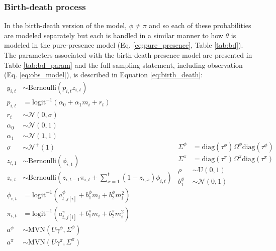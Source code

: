 \documentclass[12pt,letterpaper]{article}
\begin{document}
\subsubsection*{Birth-death process}
In the birth-death version of the model, \(\phi \neq \pi\) and so each of these probabilities are modeled separately but each is handled in a similar manner to how \(\theta\) is modeled in the pure-presence model (Eq. \ref{eq:pure_presence}, Table \ref{tab:bd}). The parameters associated with the birth-death presence model are presented in Table \ref{tab:bd_param} and the full sampling statement, including observation (Eq. \ref{eq:obs_model}), is described in Equation \ref{eq:birth_death}:
\begin{equation}
  \begin{split}
    y_{i, t} &\sim \text{Bernoulli}(p_{i, t} z_{i, t}) \\
    p_{i, t} &= \text{logit}^{-1}(\alpha_{0} + \alpha_{1} m_{i} + r_{t}) \\ 
    r_{t} &\sim \mathcal{N}(0, \sigma) \\
    \alpha_{0} &\sim \mathcal{N}(0, 1) \\
    \alpha_{1} &\sim \mathcal{N}(1, 1) \\
    \sigma &\sim \mathcal{N}^{+}(1) \\
    z_{i, 1} &\sim \text{Bernoulli}(\phi_{i, 1}) \\
    z_{i, t} &\sim \text{Bernoulli}\left(z_{i, t - 1} \pi_{i,t} + \sum_{x = 1}^{t}(1 - z_{i, x}) \phi_{i,t}\right) \\
    \phi_{i, t} &= \text{logit}^{-1}(a^{\phi}_{t, j[i]} + b^{\phi}_{1} m_{i} + b^{\phi}_{2} m_{i}^{2}) \\
    \pi_{i, t} &= \text{logit}^{-1}(a^{\pi}_{t, j[i]} + b^{\pi}_{1} m_{i} + b^{\pi}_{2} m_{i}^{2}) \\
    a^{\phi} &\sim \text{MVN}(U \gamma^{\phi}, \Sigma^{\phi}) \\
    a^{\pi} &\sim \text{MVN}(U \gamma^{\pi}, \Sigma^{\pi}) \\
  \end{split}
  \begin{split}
    \Sigma^{\phi} &= \text{diag}(\tau^{\phi}) \Omega^{\phi} \text{diag}(\tau^{\phi}) \\
    \Sigma^{\pi} &= \text{diag}(\tau^{\pi}) \Omega^{\pi} \text{diag}(\tau^{\pi}) \\
    \rho &\sim \text{U}(0, 1) \\
    b^{\phi}_{1} &\sim \mathcal{N}(0, 1) \\

\end{split}
\end{equation}
\end{document}

